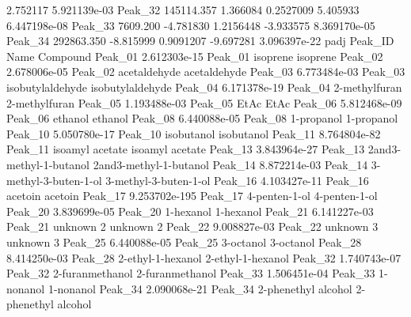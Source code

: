 \documentclass[]{article}
\begin{document}
  2.752117  5.921139e-03 Peak\_32  145114.357       1.366084 0.2527009   5.405933  6.447198e-08 Peak\_33    7609.200      -4.781830 1.2156448  -3.933575  8.369170e-05 Peak\_34  292863.350      -8.815999 0.9091207  -9.697281  3.096397e-22                  padj Peak\_ID                   Name               Compound Peak\_01  2.612303e-15 Peak\_01               isoprene               isoprene Peak\_02  2.678006e-05 Peak\_02           acetaldehyde           acetaldehyde Peak\_03  6.773484e-03 Peak\_03       isobutylaldehyde       isobutylaldehyde Peak\_04  6.171378e-19 Peak\_04          2-methylfuran          2-methylfuran Peak\_05  1.193488e-03 Peak\_05                   EtAc                   EtAc Peak\_06  5.812468e-09 Peak\_06                ethanol                ethanol Peak\_08  6.440088e-05 Peak\_08             1-propanol             1-propanol Peak\_10  5.050780e-17 Peak\_10             isobutanol             isobutanol Peak\_11  8.764804e-82 Peak\_11        isoamyl acetate        isoamyl acetate Peak\_13  3.843964e-27 Peak\_13 2and3-methyl-1-butanol 2and3-methyl-1-butanol Peak\_14  8.872214e-03 Peak\_14  3-methyl-3-buten-1-ol  3-methyl-3-buten-1-ol Peak\_16  4.103427e-11 Peak\_16                acetoin                acetoin Peak\_17 9.253702e-195 Peak\_17          4-penten-1-ol          4-penten-1-ol Peak\_20  3.839699e-05 Peak\_20              1-hexanol              1-hexanol Peak\_21  6.141227e-03 Peak\_21              unknown 2              unknown 2 Peak\_22  9.008827e-03 Peak\_22              unknown 3              unknown 3 Peak\_25  6.440088e-05 Peak\_25              3-octanol              3-octanol Peak\_28  8.414250e-03 Peak\_28      2-ethyl-1-hexanol      2-ethyl-1-hexanol Peak\_32  1.740743e-07 Peak\_32        2-furanmethanol        2-furanmethanol Peak\_33  1.506451e-04 Peak\_33              1-nonanol              1-nonanol Peak\_34  2.090068e-21 Peak\_34    2-phenethyl alcohol    2-phenethyl alcohol 
\end{document}
